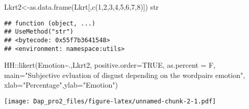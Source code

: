 \documentclass[
]{article}
\newenvironment{Shaded}{\begin{snugshade}}{\end{snugshade}}
\newcommand{\AttributeTok}[1]{\textcolor[rgb]{0.77,0.63,0.00}{#1}}
\newcommand{\ConstantTok}[1]{\textcolor[rgb]{0.00,0.00,0.00}{#1}}
\newcommand{\DecValTok}[1]{\textcolor[rgb]{0.00,0.00,0.81}{#1}}
\newcommand{\FunctionTok}[1]{\textcolor[rgb]{0.00,0.00,0.00}{#1}}
\newcommand{\NormalTok}[1]{#1}
\newcommand{\OtherTok}[1]{\textcolor[rgb]{0.56,0.35,0.01}{#1}}
\newcommand{\SpecialCharTok}[1]{\textcolor[rgb]{0.00,0.00,0.00}{#1}}
\newcommand{\StringTok}[1]{\textcolor[rgb]{0.31,0.60,0.02}{#1}}
\begin{document}
\begin{Shaded}
\begin{Highlighting}[]
\NormalTok{Lkrt2}\OtherTok{\textless{}{-}}\FunctionTok{as.data.frame}\NormalTok{(Lkrt[,}\FunctionTok{c}\NormalTok{(}\DecValTok{1}\NormalTok{,}\DecValTok{2}\NormalTok{,}\DecValTok{3}\NormalTok{,}\DecValTok{4}\NormalTok{,}\DecValTok{5}\NormalTok{,}\DecValTok{6}\NormalTok{,}\DecValTok{7}\NormalTok{,}\DecValTok{8}\NormalTok{)])}
\NormalTok{str}
\end{Highlighting}
\end{Shaded}

\begin{verbatim}
## function (object, ...) 
## UseMethod("str")
## <bytecode: 0x55f7b3641548>
## <environment: namespace:utils>
\end{verbatim}

\begin{Shaded}
\begin{Highlighting}[]
\NormalTok{HH}\SpecialCharTok{::}\FunctionTok{likert}\NormalTok{(Emotion}\SpecialCharTok{\textasciitilde{}}\NormalTok{.,Lkrt2, }\AttributeTok{positive.order=}\ConstantTok{TRUE}\NormalTok{, }\AttributeTok{as.percent =}\NormalTok{ F,}
           \AttributeTok{main=}\StringTok{"Subjective evluation of disgust depending on the wordpairs emotion"}\NormalTok{,}
           \AttributeTok{xlab=}\StringTok{"Percentage"}\NormalTok{,}\AttributeTok{ylab=}\StringTok{"Emotion"}\NormalTok{)}
\end{Highlighting}
\end{Shaded}

\texttt{[image: Dap\_pro2\_files/figure-latex/unnamed-chunk-2-1.pdf]}
\end{document}
